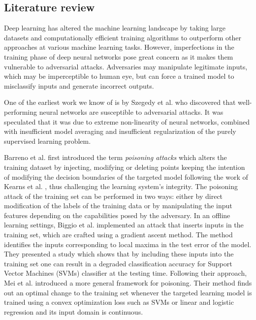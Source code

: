 \subsection{Literature review}
Deep learning has altered the machine learning landscape by taking large datasets and computationally efficient training algorithms to outperform other approaches at various machine learning tasks. However, imperfections in the training phase of deep neural networks pose great concern as it makes them vulnerable to adversarial attacks. Adversaries may manipulate legitimate inputs, which may be imperceptible to human eye, but can force a trained model to misclassify inputs and generate incorrect outputs.

One of the earliest work we know of is by Szegedy et al. \cite{Szegedy13} who discovered that well-performing neural networks are susceptible to adversarial attacks. It was  speculated that it was due to extreme non-linearity of neural networks, combined with insufficient model averaging and insufficient regularization of the purely supervised learning problem. 

Barreno et al. \cite{BarrenoNSJT06} first introduced the term \emph{poisoning attacks} which alters the training dataset by injecting, modifying or deleting points keeping the intention of modifying the decision boundaries of the targeted model following the work of Kearns et al. \cite{KearnsL93}, thus challenging the learning system's integrity. The poisoning attack of the training set can be performed in two ways: either by direct modification of the labels of the training data or by manipulating the input features depending on the capabilities posed by the adversary. In an offline learning settings, Biggio et al. \cite{BiggioNL12} implemented an attack that inserts inputs in the training set, which are crafted using a gradient ascent method. The method identifies the inputs corresponding to local maxima in the test error of the model. They presented a study which shows that by including these inputs into the training set one can result in a degraded classification accuracy for Support Vector Machines (SVMs) classifier at the testing time. Following their approach, Mei et al. \cite{MeiZ15} introduced a more general framework for poisoning. Their method finds out an optimal change to the training set whenever the targeted learning model is trained using a convex optimization loss such as SVMs or linear and logistic regression and its input domain is continuous.

